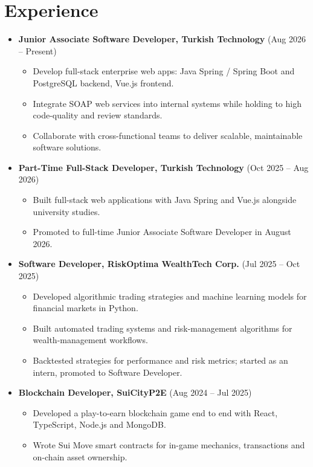 \documentclass{article}
\begin{document}
\section*{Experience}
\vspace{-0.5em}
\begin{itemize}
    \item \textbf{Junior Associate Software Developer, Turkish Technology} (Aug 2026 -- Present)
    \begin{itemize}
        \item Develop full-stack enterprise web apps: Java Spring / Spring Boot and PostgreSQL backend, Vue.js frontend.
        \item Integrate SOAP web services into internal systems while holding to high code-quality and review standards.
        \item Collaborate with cross-functional teams to deliver scalable, maintainable software solutions.
    \end{itemize}
    \item \textbf{Part-Time Full-Stack Developer, Turkish Technology} (Oct 2025 -- Aug 2026)
    \begin{itemize}
        \item Built full-stack web applications with Java Spring and Vue.js alongside university studies.
        \item Promoted to full-time Junior Associate Software Developer in August 2026.
    \end{itemize}
    \item \textbf{Software Developer, RiskOptima WealthTech Corp.} (Jul 2025 -- Oct 2025)
    \begin{itemize}
        \item Developed algorithmic trading strategies and machine learning models for financial markets in Python.
        \item Built automated trading systems and risk-management algorithms for wealth-management workflows.
        \item Backtested strategies for performance and risk metrics; started as an intern, promoted to Software Developer.
    \end{itemize}
    \item \textbf{Blockchain Developer, SuiCityP2E} (Aug 2024 -- Jul 2025)
    \begin{itemize}
        \item Developed a play-to-earn blockchain game end to end with React, TypeScript, Node.js and MongoDB.
        \item Wrote Sui Move smart contracts for in-game mechanics, transactions and on-chain asset ownership.

\end{itemize}
\end{itemize}
\end{document}

